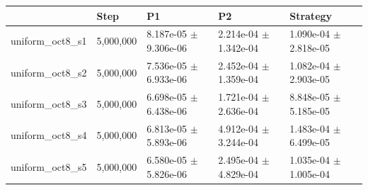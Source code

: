 \begin{tabular}{lllll}
\toprule
 & Step & P1 & P2 & Strategy \\
\midrule
uniform\_oct8\_s1 & 5,000,000 & 8.187e-05 $\pm$ 9.306e-06 & 2.214e-04 $\pm$ 1.342e-04 & 1.090e-04 $\pm$ 2.818e-05 \\
uniform\_oct8\_s2 & 5,000,000 & 7.536e-05 $\pm$ 6.933e-06 & 2.452e-04 $\pm$ 1.359e-04 & 1.082e-04 $\pm$ 2.903e-05 \\
uniform\_oct8\_s3 & 5,000,000 & 6.698e-05 $\pm$ 6.438e-06 & 1.721e-04 $\pm$ 2.636e-04 & 8.848e-05 $\pm$ 5.185e-05 \\
uniform\_oct8\_s4 & 5,000,000 & 6.813e-05 $\pm$ 5.893e-06 & 4.912e-04 $\pm$ 3.244e-04 & 1.483e-04 $\pm$ 6.499e-05 \\
uniform\_oct8\_s5 & 5,000,000 & 6.580e-05 $\pm$ 5.826e-06 & 2.495e-04 $\pm$ 4.829e-04 & 1.035e-04 $\pm$ 1.005e-04 \\
\bottomrule
\end{tabular}
